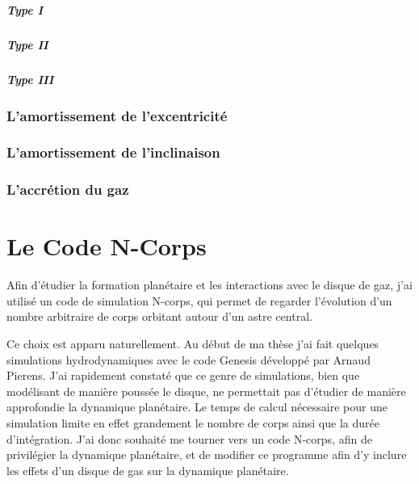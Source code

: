 \documentclass[logos,parttoc]{bordeaux-thesis}
\begin{document}
\paragraph{Type I}
\paragraph{Type II}
\paragraph{Type III}

\subsection{L'amortissement de l'excentricité}%

\subsection{L'amortissement de l'inclinaison}%

\subsection{L'accrétion du gaz}

\chapter{Le Code N-Corps}
Afin d'étudier la formation planétaire et les interactions avec le disque de gaz, j'ai utilisé un code de simulation N-corps, qui permet de regarder l'évolution d'un nombre arbitraire de corps orbitant autour d'un astre central. 

Ce choix est apparu naturellement. Au début de ma thèse j'ai fait quelques simulations hydrodynamiques avec le code Genesis développé par Arnaud Pierens. J'ai rapidement constaté que ce genre de simulations, bien que modélisant de manière poussée le disque, ne permettait pas d'étudier de manière approfondie la dynamique planétaire. Le temps de calcul nécessaire pour une simulation limite en effet grandement le nombre de corps ainsi que la durée d'intégration. J'ai donc souhaité me tourner vers un code N-corps, afin de privilégier la dynamique planétaire, et de modifier ce programme afin d'y inclure les effets d'un disque de gas sur la dynamique planétaire. 
\end{document}
